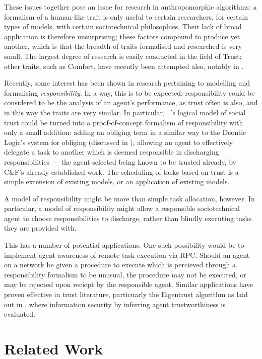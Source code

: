 These issues together pose an issue for research in anthropomorphic algorithms: a formalism of a human-like trait is only useful to certain researchers, for certain types of models, with certain sociotechnical philosophies. Their lack of broad application is therefore unsurprising; these factors compound to produce yet another, which is that the breadth of traits formalised and researched is very small. The largest degree of research is easily conducted in the field of Trust; other traits, such as Comfort, have recently been attempted also, notably in \cite{marsh2011defining}.

Recently, some interest has been shown in research pertaining to modelling and formalising \emph{responsibility}. In a way, this is to be expected: responsibility could be considered to be the analysis of an agent's performance, as trust often is also, and in this way the traits are very similar. In particular, \cite{CastelfranchiSocialApproach}~'s logical model of social trust could be turned into a proof-of-concept formalism of responsibility with only a small addition: adding an obliging term in a similar way to the Deontic Logic's system for obliging (discussed in \cite{deontic-logic}), allowing an agent to effectively delegate a task to another which is deemed responsible in discharging responsibilities --- the agent selected being known to be trusted already, by C\&F's already established work. The scheduling of tasks based on trust is a simple extension of existing models, or an application of existing models.\par

A model of responsibility might be more than simple task allocation, however. In particular, a model of responsibility might allow a responsible sociotechnical agent to choose responsibilities to discharge, rather than blindly executing tasks they are provided with.\par

This has a number of potential applications. One such possibility would be to implement agent awareness of remote task execution via RPC. Should an agent on a network be given a procedure to execute which is percieved through a responsibility formalism to be unusual, the procedure may not be executed, or may be rejected upon reciept by the responsible agent. Similar applications have proven effective in trust literature, particuarly the Eigentrust algorithm as laid out in \cite{}, where information security by inferring agent trustworthiness is evaluated.

\section{Related Work}\label{sec:related_work}


